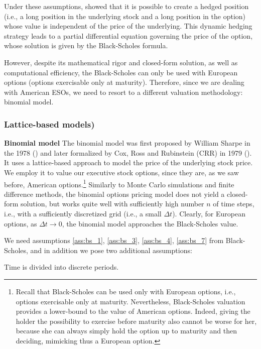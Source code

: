     Under these assumptions, \cite{black1973pricing} showed that it is possible to create a hedged position (i.e., a long position in the underlying stock and a long position in the option) whose value is independent of the price of the underlying. This dynamic hedging strategy leads to a partial differential equation governing the price of the option, whose solution is given by the Black-Scholes formula.

    However, despite its mathematical rigor and closed-form solution, as well as computational efficiency, the Black-Scholes can only be used with European options (options exercisable only at maturity). Therefore, since we are dealing with American ESOs, we need to resort to a different valuation methodology: binomial model.

\subsubsection*{Lattice-based models)} 
\textbf{Binomial model}
The binomial model was first proposed by William Sharpe in the 1978 (\cite{sharpe1978investments}) and later formalized by Cox, Ross and Rubinstein (CRR) in 1979 (\cite{cox1979option}). It uses a lattice-based approach to model the price of the underlying stock price. We employ it to value our executive stock options, since they are, as we saw before, American options.\footnote{Recall that Black-Scholes can be used only with European options, i.e., options exercisable only at maturity. Nevertheless, Black-Scholes valuation provides a lower-bound to the value of American options. Indeed, giving the holder the possibility to exercise before maturity also cannot be worse for her, because she can always simply hold the option up to maturity and then deciding, mimicking thus a European option.}
Similarly to Monte Carlo simulations and finite difference methods, the binomial options pricing model does not yield a closed-form solution, but works quite well with sufficiently high number $n$ of time steps, i.e., with a sufficiently discretized grid (i.e., a small $\Delta t$). Clearly, for European options, as $\Delta t \rightarrow 0$, the binomial model approaches the Black-Scholes value.

We need assumptions \ref*{ass:bs_1}, \ref*{ass:bs_3}, \ref*{ass:bs_4}, \ref*{ass:bs_7} from Black-Scholes, and in addition we pose two additional assumptions:

\begin{assumption}
    \label{ass:bin_8}
    Time is divided into discrete periods.
\end{assumption}

